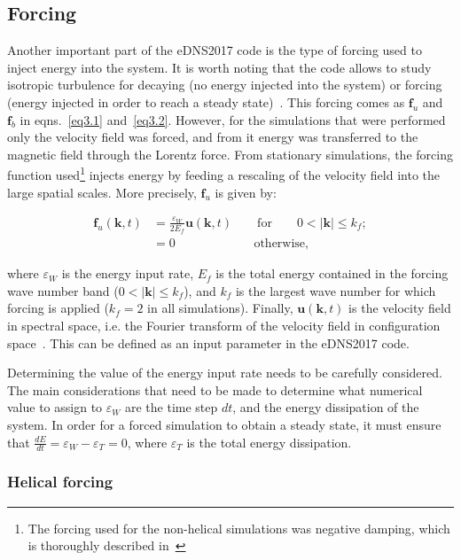 \documentclass[12pt,a4paper]{report}
\begin{document}
\subsection{Forcing}

Another important part of the eDNS2017 code is the type of forcing used to inject energy into the system. It is worth noting that the code allows to study isotropic turbulence for decaying (no energy injected into the system) or forcing (energy injected in order to reach a steady state)~\cite{LinkmannMoritzFrederikLeon2016Spim}. This forcing comes as $\bm f_u$ and $\bm f_b$ in eqns.~\ref{eq3.1} and~\ref{eq3.2}. However, for the simulations that were performed only the velocity field was forced, and from it energy was transferred to the magnetic field through the Lorentz force. From stationary simulations, the forcing function used\footnote{The forcing used for the non-helical simulations was negative damping, which is thoroughly described in~\cite{chalupa2017comparison}} injects energy by feeding a rescaling of the velocity field into the large spatial scales. More precisely, $\bm f_u$ is given by:

\begin{align}
 \bm f_u(\bm k, t) &= \frac{\varepsilon_W}{2 E_f} \bm u(\bm k, t) \qquad \text{for} \qquad 0 < \vert \bm k \vert \leq k_f; \nonumber \\
 &= 0 \,\, \qquad \qquad \qquad \text{otherwise,} \nonumber
\end{align}

where $\varepsilon_W$ is the energy input rate, $E_f$ is the total energy contained in the forcing wave number band ($0 < \vert \bm k \vert \leq k_f$), and $k_f$ is the largest wave number for which forcing is applied ($k_f=2$ in all simulations). Finally, $\bm u(\bm k, t)$ is the velocity field in spectral space, i.e. the Fourier transform of the velocity field in configuration space~\cite{LinkmannMoritzFrederikLeon2016Spim}. This can be defined as an input parameter in the eDNS2017 code. 

Determining the value of the energy input rate needs to be carefully considered. The main considerations that need to be made to determine what numerical value to assign to $\varepsilon_W$ are the time step $dt$, and the energy dissipation of the system. In order for a forced simulation to obtain a steady state, it must ensure that $\frac{dE}{dt}=\varepsilon_W - \varepsilon_T = 0$, where $\varepsilon_T$ is the total energy dissipation.

\subsubsection{Helical forcing}
\end{document}
